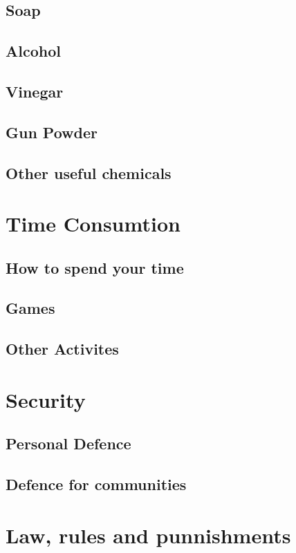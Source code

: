 \documentclass[ebook,12pt,oneside,openany]{memoir}
\begin{document}
\section{Soap}
\section{Alcohol}
\section{Vinegar}
\section{Gun Powder}
\section{Other useful chemicals}



\chapter{Time Consumtion}
\section{How to spend your time}
\section{Games}
\section{Other Activites}



\chapter{Security}
\section{Personal Defence}
\section{Defence for communities}



\chapter{Law, rules and punnishments}
\end{document}
